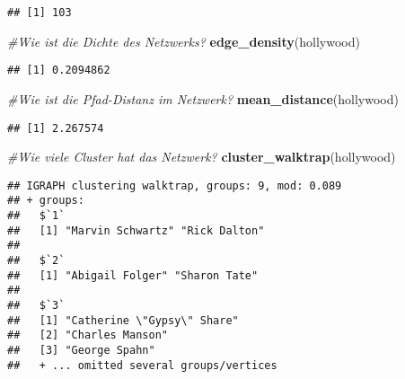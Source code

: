 \documentclass[
]{article}
\newenvironment{Shaded}{\begin{snugshade}}{\end{snugshade}}
\newcommand{\CommentTok}[1]{\textcolor[rgb]{0.56,0.35,0.01}{\textit{#1}}}
\newcommand{\KeywordTok}[1]{\textcolor[rgb]{0.13,0.29,0.53}{\textbf{#1}}}
\newcommand{\NormalTok}[1]{#1}
\begin{document}
\begin{verbatim}
## [1] 103
\end{verbatim}

\begin{Shaded}
\begin{Highlighting}[]
\CommentTok{#Wie    ist die Dichte  des Netzwerks?}
\KeywordTok{edge_density}\NormalTok{(hollywood)}
\end{Highlighting}
\end{Shaded}

\begin{verbatim}
## [1] 0.2094862
\end{verbatim}

\begin{Shaded}
\begin{Highlighting}[]
\CommentTok{#Wie    ist die Pfad-Distanz    im  Netzwerk?}
\KeywordTok{mean_distance}\NormalTok{(hollywood)}
\end{Highlighting}
\end{Shaded}

\begin{verbatim}
## [1] 2.267574
\end{verbatim}

\begin{Shaded}
\begin{Highlighting}[]
\CommentTok{#Wie    viele   Cluster hat das Netzwerk?}
\KeywordTok{cluster_walktrap}\NormalTok{(hollywood)}
\end{Highlighting}
\end{Shaded}

\begin{verbatim}
## IGRAPH clustering walktrap, groups: 9, mod: 0.089
## + groups:
##   $`1`
##   [1] "Marvin Schwartz" "Rick Dalton"    
##   
##   $`2`
##   [1] "Abigail Folger" "Sharon Tate"   
##   
##   $`3`
##   [1] "Catherine \"Gypsy\" Share"                       
##   [2] "Charles Manson"                                  
##   [3] "George Spahn"                                    
##   + ... omitted several groups/vertices
\end{verbatim}
\end{document}
